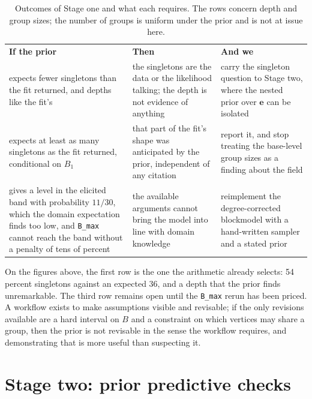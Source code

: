 \documentclass[11pt]{article}
\newcommand{\doublerule}{%
  \specialrule{0.5pt}{-1pt}{1pt}%
  \specialrule{0.5pt}{0pt}{1pt}}
\newcommand{\code}[1]{\texttt{\small #1}}
\begin{document}
\begin{table}[!t]
\centering
\setlength{\tabcolsep}{4.5pt}
\caption{Outcomes of Stage one and what each requires. The rows concern depth
  and group sizes; the number of groups is uniform under the prior and is not
  at issue here.}
\label{tab:pushforward}
\begin{tabular}{@{}P{4.4cm}P{4.2cm}P{5.6cm}@{}}
\toprule
\textbf{If the prior} & \textbf{Then} & \textbf{And we}\\
\doublerule
expects fewer singletons than the fit returned, and depths like the fit's
  & the singletons are the data or the likelihood talking; the depth is not
    evidence of anything
  & carry the singleton question to Stage two, where the nested prior over
    $\bm{e}$ can be isolated\\
expects at least as many singletons as the fit returned, conditional on
  $B_1$
  & that part of the fit's shape was anticipated by the prior, independent of
    any citation
  & report it, and stop treating the base-level group sizes as a finding
    about the field\\
gives a level in the elicited band with probability $11/30$, which the
  domain expectation finds too low, and \code{B_max} cannot reach the band
  without a penalty of tens of percent
  & the available arguments cannot bring the model into line with domain
    knowledge
  & reimplement the degree-corrected blockmodel with a hand-written sampler and
    a stated prior\\
\bottomrule
\end{tabular}
\end{table}

On the figures above, the first row is the one the arithmetic already
selects: 54 percent singletons against an expected 36, and a depth that the
prior finds unremarkable. The third row remains open until the \code{B_max}
rerun has been priced. A workflow exists to make assumptions visible and
revisable; if the only revisions available are a hard interval on $B$ and a
constraint on which vertices may share a group, then the prior is not
revisable in the sense the workflow requires, and demonstrating that is more
useful than suspecting it.

\section{Stage two: prior predictive checks}
\label{sec:predictive}
\end{document}
